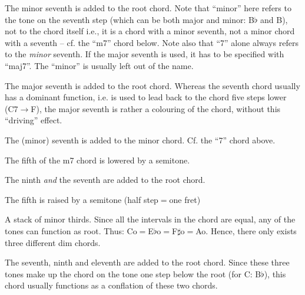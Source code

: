 {\raggedbottom
{}\par
{\raggedright \small The minor seventh is added to the root chord. Note that
``minor'' here refers to the tone on the seventh step (which can be both
major and minor: B$\flat$ and B), not to the chord itself i.e., it is a chord
with a minor seventh, not a minor chord with a seventh -- cf. the ``m7'' chord
below. Note also that ``7'' alone always refers to the \emph{minor} seventh. If the
major seventh is used, it has to be specified with ``maj7''. The
``minor'' is usually left out of the name.}

\par
{\raggedright \small The major seventh is added to the root
chord. Whereas the seventh chord usually has a dominant function,
i.e. is used to lead back to the chord five steps lower (C7$\to$F), the
major seventh is rather a colouring of the chord, without this
``driving'' effect.}

\par
{\raggedright \small The (minor) seventh is added to the minor
chord. Cf. the ``7'' chord above.}

\par
{\raggedright \small The fifth of the m7 chord is lowered by a semitone.}

\par
{\raggedright \small The ninth \emph{and} the seventh are added to the root
chord.}

\par %
{\raggedright \small The fifth is raised by a semitone (half
step$=$one fret)}

\par %
{\raggedright \small A stack of minor thirds. Since all the intervals in the chord are
equal, any of the tones can function as root. Thus:
Co$=$E$\flat$o$=$F$\sharp$o$=$Ao. Hence, there only exists three different dim chords.}

\par
{\raggedright \small The seventh, ninth and eleventh are added to the
root chord. Since these three tones make up the chord on the tone one
step below the root (for C: B$\flat$), this chord usually functions as a
conflation of these two chords.}

}
